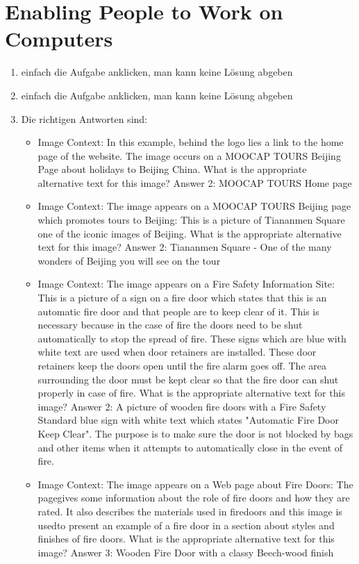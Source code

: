 \documentclass{article}
\begin{document}
	\section*{Enabling People to Work on Computers}
	\begin{enumerate}[label=(\alph*)]
		\item einfach die Aufgabe anklicken, man kann keine Lösung abgeben
		\item einfach die Aufgabe anklicken, man kann keine Lösung abgeben
		\item Die richtigen Antworten sind:
		\begin{itemize}
			\item Image Context: In this example, behind the logo lies a link to the  home page of the website. The image occurs on a MOOCAP TOURS Beijing Page about holidays to Beijing China. What is the appropriate alternative text for this image? \textcolor{green!90!black}{Answer 2: MOOCAP TOURS Home page}
			\item Image Context: The image appears on a MOOCAP TOURS Beijing page which promotes tours to Beijing: This is a picture of  Tiananmen Square one of the iconic images of Beijing. What is the appropriate alternative text for this image? \textcolor{green!90!black}{Answer 2: Tiananmen Square - One of the many wonders of Beijing you will see on the tour}
			\item Image Context: The image appears on a Fire Safety Information Site: This is a picture of  a sign on a  fire door which states that this is an automatic fire door and that people are to keep clear of it. This is necessary because in the case of fire the doors need to be shut automatically to stop the spread of fire. These signs which are blue with white text are used when door retainers  are installed. These door retainers keep the doors open until the fire alarm goes off. The area surrounding the door must be kept clear so that the fire door can shut properly in case of fire. What is the appropriate alternative text for this image? \textcolor{green!90!black}{Answer 2: A picture of wooden fire doors with a Fire Safety Standard blue sign with white text which states "Automatic Fire Door Keep Clear". The purpose is to make sure the door is not blocked by bags and other items when it attempts to automatically close in the event of fire.}
			\item Image Context: The image appears on a Web page about Fire Doors: The pagegives some information about the role of fire doors and how they are rated. It also describes the materials used in firedoors and this image is usedto present an example of a fire door in a section about  styles and finishes of fire doors. What is the appropriate alternative text for this image? \textcolor{green!90!black}{Answer 3: Wooden Fire Door with a classy Beech-wood finish}

\end{itemize}
\end{enumerate}
\end{document}
